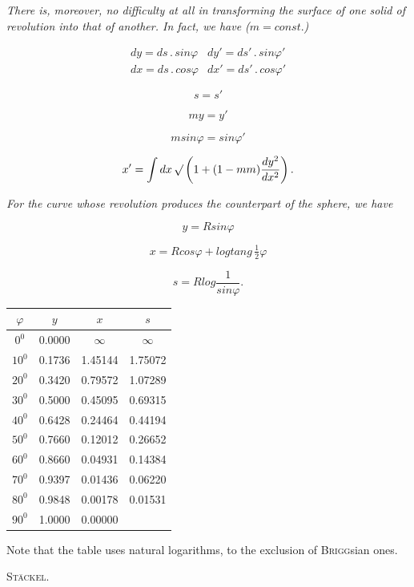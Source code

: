 \par{}%
\emph{There is, moreover, no difficulty at all in transforming the surface of one solid of revolution into that of another. In fact, we have ($m = \mathit{const.}$)}

\[
\begin{array}{cc}
dy = ds \,.\, \mathit{sin}\varphi & dy' = ds' \,.\, \mathit{sin}\varphi' \\[4pt]
dx = ds \,.\, \mathit{cos}\varphi & dx' = ds' \,.\, \mathit{cos}\varphi'
\end{array}
\]

\[
s = s'
\]

\[
my = y'
\]

\[
m \mathit{sin}\varphi = \mathit{sin}\varphi'
\]

\[
x' = \int dx\, \mathord{\surd}\left(1 + (1 - mm)\frac{dy^2}{dx^2}\right).
\]

\begin{center}\begin{minipage}{\linewidth}\centering

\end{minipage}\end{center}

\emph{For the curve whose revolution produces the counterpart of the sphere, we have}

\[
y = R \mathit{sin}\varphi
\]

\[
x = R \mathit{cos}\varphi + \mathit{log} \mathit{tang}\, \tfrac{1}{2}\varphi
\]

\[
s = R \mathit{log} \frac{1}{\mathit{sin}\varphi}.
\]

\begin{center}\begin{minipage}{\linewidth}\centering

\end{minipage}\end{center}

\begin{center}
\begin{tabular}{c|c|c|c}
$\varphi$ & $y$ & $x$ & $s$ \\
\hline
$0^0$ & 0.0000 & $\infty$ & $\infty$ \\
$10^0$ & 0.1736 & 1.45144 & 1.75072 \\
$20^0$ & 0.3420 & 0.79572 & 1.07289 \\
$30^0$ & 0.5000 & 0.45095 & 0.69315 \\
$40^0$ & 0.6428 & 0.24464 & 0.44194 \\
$50^0$ & 0.7660 & 0.12012 & 0.26652 \\
$60^0$ & 0.8660 & 0.04931 & 0.14384 \\
$70^0$ & 0.9397 & 0.01436 & 0.06220 \\
$80^0$ & 0.9848 & 0.00178 & 0.01531 \\
$90^0$ & 1.0000 & 0.00000 & \\
\end{tabular}
\end{center}

Note that the table uses natural logarithms, to the exclusion of \textsc{Brigg}sian ones.

\hfill \textsc{Stäckel}.
